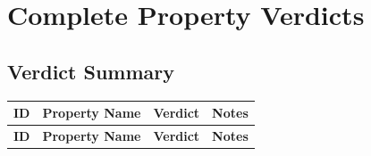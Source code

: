 \documentclass[11pt,a4paper]{article}
\begin{document}
\section{Complete Property Verdicts}

\subsection{Verdict Summary}

\begin{longtable}{|c|l|c|l|}
\hline
\rowcolor{lightgray}
\textbf{ID} & \textbf{Property Name} & \textbf{Verdict} & \textbf{Notes} \\
\hline
\endfirsthead
\hline
\rowcolor{lightgray}
\textbf{ID} & \textbf{Property Name} & \textbf{Verdict} & \textbf{Notes} \\
\hline
\endhead


\end{longtable}
\end{document}
